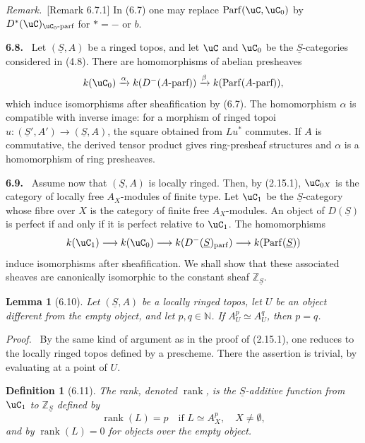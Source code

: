 \documentclass[11pt]{article}
\theoremstyle{plain}
\newtheorem*{lemma*}{Lemma}
\newtheorem*{definition*}{Definition}
\theoremstyle{definition}
\theoremstyle{remark}
\newenvironment{statement}[1]{\par\medskip\noindent\textbf{#1.}\ }{\par\medskip}
\newenvironment{prooftext}{\par\noindent\textit{Proof.}\ }{\par\medskip}
\newenvironment{remarktext}{\par\medskip\noindent\textit{Remark.}\ }{\par\medskip}
\newcommand{\NN}{\mathbb N}
\newcommand{\ZZ}{\mathbb Z}
\providecommand{\Parf}{\operatorname{Parf}}
\providecommand{\uS}{\underline{S}}
\providecommand{\rg}{\operatorname{rank}}
\begin{document}
\begin{remarktext}[Remark 6.7.1]
In (6.7) one may replace $\Parf(\uC,\uC_0)$ by $D^*(\uC)_{\uC_0\text{-parf}}$ for $*=-$ or $b$.
\end{remarktext}

\begin{statement}{6.8}
Let $(\uS,A)$ be a ringed topos, and let $\uC$ and $\uC_0$ be the $\uS$-categories considered in (4.8). There are homomorphisms of abelian presheaves
\[
k(\uC_0)\xrightarrow{\alpha}k(D^-(A\text{-parf}))
\xrightarrow{\beta}k(\Parf(A\text{-parf})),
\]
which induce isomorphisms after sheafification by (6.7). The homomorphism $\alpha$ is compatible with inverse image: for a morphism of ringed topoi $u:(\uS',A')\to(\uS,A)$, the square obtained from $Lu^*$ commutes. If $A$ is commutative, the derived tensor product gives ring-presheaf structures and $\alpha$ is a homomorphism of ring presheaves.
\end{statement}

\begin{statement}{6.9}
Assume now that $(\uS,A)$ is locally ringed. Then, by (2.15.1), $\uC_{0X}$ is the category of locally free $A_X$-modules of finite type. Let $\uC_1$ be the $\uS$-category whose fibre over $X$ is the category of finite free $A_X$-modules. An object of $D(\uS)$ is perfect if and only if it is perfect relative to $\uC_1$. The homomorphisms
\[
k(\uC_1)\longrightarrow k(\uC_0)\longrightarrow
k(D^-(\uS)_{\mathrm{parf}})\longrightarrow k(\Parf(\uS))
\]
induce isomorphisms after sheafification. We shall show that these associated sheaves are canonically isomorphic to the constant sheaf $\ZZ_{\uS}$.
\end{statement}

\begin{lemma*}[6.10]
Let $(\uS,A)$ be a locally ringed topos, let $U$ be an object different from the empty object, and let $p,q\in\NN$. If $A_U^p\simeq A_U^q$, then $p=q$.
\end{lemma*}

\begin{prooftext}
By the same kind of argument as in the proof of (2.15.1), one reduces to the locally ringed topos defined by a prescheme. There the assertion is trivial, by evaluating at a point of $U$.
\end{prooftext}

\begin{definition*}[6.11]
The \emph{rank}, denoted $\rg$, is the $\uS$-additive function from $\uC_1$ to $\ZZ_{\uS}$ defined by
\[
\rg(L)=p\quad\text{if }L\simeq A_X^p,
\quad X\ne\emptyset,
\]
and by $\rg(L)=0$ for objects over the empty object.
\end{definition*}
\end{document}
